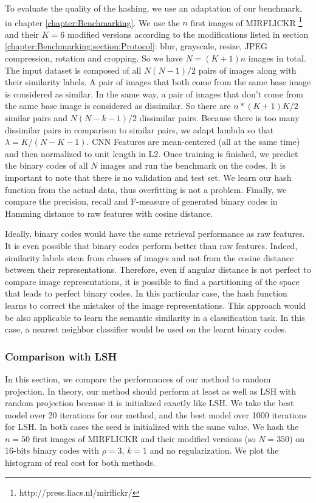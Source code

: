 To evaluate the quality of the hashing, we use an adaptation of our benchmark, in chapter \ref{chapter:Benchmarking}. We use the $n$ first images of MIRFLICKR \footnote{http://press.liacs.nl/mirflickr/} and their $K=6$ modified versions according to the modifications listed in section \ref{chapter:Benchmarking:section:Protocol}: blur, grayscale, resize, JPEG compression, rotation and cropping. So we have $N=(K+1)n$ images in total. The input dataset is composed of all $N(N-1)/2$ pairs of images along with their similarity labels. A pair of images that both come from the same base image is considered as similar. In the same way, a pair of images that don't come from the same base image is considered as dissimilar. So there are $n*(K+1)K/2$ similar pairs and $N(N-k-1)/2$ dissimilar pairs. Because there is too many dissimilar pairs in comparison to similar pairs, we adapt lambda so that $\lambda=K/(N-K-1)$. CNN Features are mean-centered (all at the same time) and then normalized to unit length in L2. Once training is finished, we predict the binary codes of all $N$ images and run the benchmark on the codes. It is important to note that there is no validation and test set. We learn our hash function from the actual data, thus overfitting is not a problem. Finally, we compare the precision, recall and F-measure of generated binary codes in Hamming distance to raw features with cosine distance.

Ideally, binary codes would have the same retrieval performance as raw features. It is even possible that binary codes perform better than raw features. Indeed, similarity labels stem from classes of images and not from the cosine distance between their representations. Therefore, even if angular distance is not perfect to compare image representations, it is possible to find a partitioning of the space that leads to perfect binary codes. In this particular case, the hash function learns to correct the mistakes of the image representations. This approach would be also applicable to learn the semantic similarity in a classification task. In this case, a nearest neighbor classifier would be used on the learnt binary codes.

\subsubsection{Comparison with LSH}
In this section, we compare the performances of our method to random projection. In theory, our method should perform at least as well as LSH with random projection because it is initialized exactly like LSH. We take the best model over 20 iterations for our method, and the best model over 1000 iterations for LSH. In both cases the seed is initialized with the same value. We hash the $n=50$ first images of MIRFLICKR and their modified versions (so $N=350$) on 16-bits binary codes with $\rho=3$, $k=1$ and no regularization. We plot the histogram of real cost for both methods.

